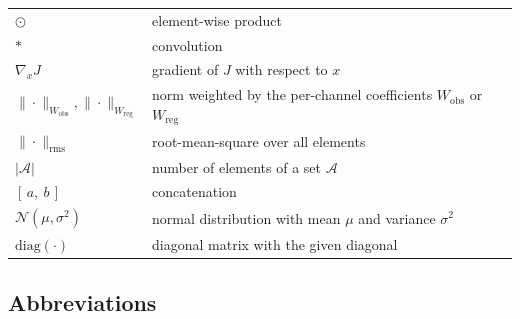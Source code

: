 \documentclass[english, 12pt, a4paper, elec, utf8, a-2b, online]{aaltothesis}
\begin{document}
\begin{longtable}{p{}L{0.72\textwidth}}
$\odot$                          & element-wise product \\
$\ast$                           & convolution \\
$\nabla_x J$                     & gradient of $J$ with respect to $x$ \\
$\|\cdot\|_{W_{\mathrm{obs}}}, \|\cdot\|_{W_{\mathrm{reg}}}$ & norm weighted by the per-channel coefficients $W_{\mathrm{obs}}$ or $W_{\mathrm{reg}}$ \\
$\|\cdot\|_{\mathrm{rms}}$       & root-mean-square over all elements \\
$|\mathcal{A}|$                  & number of elements of a set $\mathcal{A}$ \\
$[\,a,\ b\,]$                    & concatenation \\
$\mathcal{N}(\mu, \sigma^2)$     & normal distribution with mean $\mu$ and variance $\sigma^2$ \\
$\mathrm{diag}(\cdot)$           & diagonal matrix with the given diagonal \\
\end{longtable}

\subsection*{Abbreviations}
\end{document}
